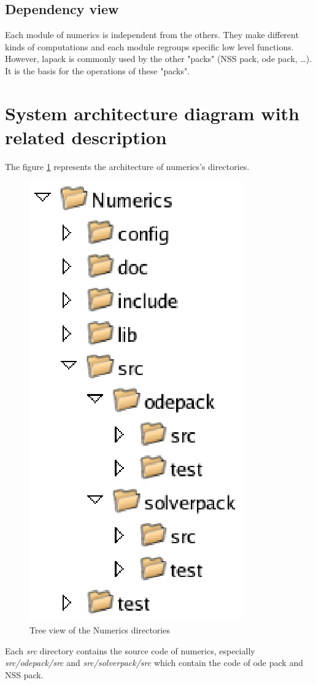 \subsection{Dependency view}
Each module of \ac{numerics} is independent from the others. They make different kinds of computations and each module regroups specific low level functions.
However, \ac{lapack} is commonly used by the other "packs" (NSS pack, \ac{ode} pack, \dots). It is the basis for the operations of these "packs".

\section{System architecture diagram with related description}
The figure \ref{fig: Tree view of the Numerics directories} represents the architecture of \ac{numerics}'s directories.
	\begin{figure}
	\begin{center}
	\includegraphics[scale=1.2, clip]{figure/NumericsDesign.eps}
	\caption{Tree view of the Numerics directories}
	\label{fig: Tree view of the Numerics directories}
	\end{center}
	\end{figure}
	
Each \textit{src} directory contains the source code of \ac{numerics}, especially \textit{src/odepack/src} and \textit{src/solverpack/src} which contain the code of \ac{ode} pack and NSS pack.
